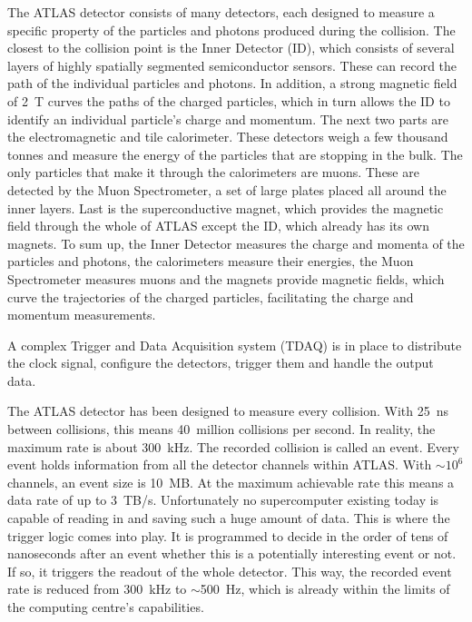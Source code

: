 \documentclass[12pt]{packages/mytustyle}  %
\begin{document}
The ATLAS detector consists of many detectors, each designed to measure a specific property of the particles and photons produced during the collision. The closest to the collision point is the Inner Detector (ID), which consists of several layers of highly spatially segmented semiconductor sensors. These can record the path of the individual particles and photons. In addition, a strong magnetic field of 2~T curves the paths of the charged particles, which in turn allows the ID to identify an individual particle's charge and momentum. The next two parts are the electromagnetic and tile calorimeter. These detectors weigh a few thousand tonnes and measure the energy of the particles that are stopping in the bulk. The only particles that make it through the calorimeters are muons. These are detected by the Muon Spectrometer, a set of large plates placed all around the inner layers. Last is the superconductive magnet, which provides the magnetic field through the whole of ATLAS except the ID, which already has its own magnets. To sum up, the Inner Detector measures the charge and momenta of the particles and photons, the calorimeters measure their energies, the Muon Spectrometer measures muons and the magnets provide magnetic fields, which curve the trajectories of the charged particles, facilitating the charge and momentum measurements.

A complex Trigger and Data Acquisition system (TDAQ) is in place to distribute the clock signal, configure the detectors, trigger them and handle the output data.

The ATLAS detector has been designed to measure every collision. With 25~ns between collisions, this means 40~million collisions per second. In reality, the maximum rate is about 300~kHz. The recorded collision is called an event. Every event holds information from all the detector channels within ATLAS. With $\sim$$10^6$ channels, an event size is 10~MB. At the maximum achievable rate this means a data rate of up to 3~TB/s. Unfortunately no supercomputer existing today is capable of reading in and saving such a huge amount of data. This is where the trigger logic comes into play. It is programmed to decide in the order of tens of nanoseconds after an event whether this is a potentially interesting event or not. If so, it triggers the readout of the whole detector. This way, the recorded event rate is reduced from 300~kHz to $\sim$500~Hz, which is already within the limits of the computing centre's capabilities.
\end{document}
